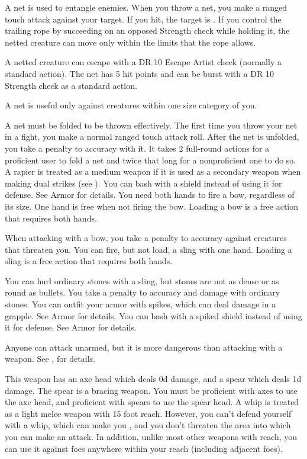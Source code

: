          A net is used to entangle enemies. When you throw a net, you make a ranged touch attack against your target. If you hit, the target is \slowed. If you control the trailing rope by succeeding on an opposed Strength check while holding it, the netted creature can move only within the limits that the rope allows.
        \par A netted creature can escape with a DR 10 Escape Artist check (normally a standard action). The net has 5 hit points and can be burst with a DR 10 Strength check as a standard action.
        \par A net is useful only against creatures within one size category of you.
        \par A net must be folded to be thrown effectively. The first time you throw your net in a fight, you make a normal ranged touch attack roll. After the net is unfolded, you take a  penalty to accuracy with it. It takes 2 full-round actions for a proficient user to fold a net and twice that long for a nonproficient one to do so.
         A rapier is treated as a medium weapon if it is used as a secondary weapon when making dual strikes (see ).
         You can bash with a shield instead of using it for defense. See Armor for details.
         You need both hands to fire a bow, regardless of its size. One hand is free when not firing the bow. Loading a bow is a free action that requires both hands.
        \par When attacking with a bow, you take a  penalty to accuracy against creatures that threaten you.
         You can fire, but not load, a sling with one hand. Loading a sling is a free action that requires both hands.
        \par You can hurl ordinary stones with a sling, but stones are not as dense or as round as bullets. You take a  penalty to accuracy and damage with ordinary stones.
         You can outfit your armor with spikes, which can deal damage in a grapple. See Armor for details.
         You can bash with a spiked shield instead of using it for defense. See Armor for details.

         Anyone can attack unarmed, but it is more dangerous than attacking with a weapon. See , for details.

         This weapon has an axe head which deals \plus0d damage, and a spear which deals \minus1d damage. The spear is a bracing weapon. You must be proficient with axes to use the axe head, and proficient with spears to use the spear head.
         A whip is treated as a light melee weapon with 15 foot reach. However, you can't defend yourself with a whip, which can make you , and you don't threaten the area into which you can make an attack. In addition, unlike most other weapons with reach, you can use it against foes anywhere within your reach (including adjacent foes).

